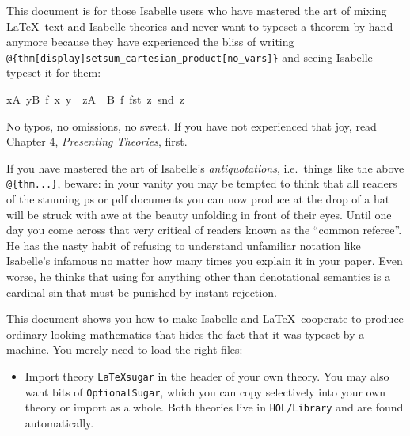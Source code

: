 %
\begin{isabellebody}%
\def\isabellecontext{Sugar}%
\isamarkupfalse%
%
\isamarkuptrue%
%
\begin{isamarkuptext}%
This document is for those Isabelle users who have mastered
the art of mixing \LaTeX\ text and Isabelle theories and never want to
typeset a theorem by hand anymore because they have experienced the
bliss of writing \verb!@!\verb!{thm[display]setsum_cartesian_product[no_vars]}!
and seeing Isabelle typeset it for them:
\begin{isabelle}%
{\isacharparenleft}{\isasymSum}x{\isasymin}A{\isachardot}\ {\isasymSum}y{\isasymin}B{\isachardot}\ f\ x\ y{\isacharparenright}\ {\isacharequal}\ {\isacharparenleft}{\isasymSum}z{\isasymin}A\ {\isasymtimes}\ B{\isachardot}\ f\ {\isacharparenleft}fst\ z{\isacharparenright}\ {\isacharparenleft}snd\ z{\isacharparenright}{\isacharparenright}%
\end{isabelle}
No typos, no omissions, no sweat.
If you have not experienced that joy, read Chapter 4, \emph{Presenting
Theories}, \cite{LNCS2283} first.

If you have mastered the art of Isabelle's \emph{antiquotations},
i.e.\ things like the above \verb!@!\verb!{thm...}!, beware: in your vanity
you may be tempted to think that all readers of the stunning ps or pdf
documents you can now produce at the drop of a hat will be struck with
awe at the beauty unfolding in front of their eyes. Until one day you
come across that very critical of readers known as the ``common referee''.
He has the nasty habit of refusing to understand unfamiliar notation
like Isabelle's infamous \isa{{\isasymlbrakk}\ {\isasymrbrakk}\ {\isasymLongrightarrow}} no matter how many times you
explain it in your paper. Even worse, he thinks that using \isa{{\isasymlbrakk}\ {\isasymrbrakk}} for anything other than denotational semantics is a cardinal sin
that must be punished by instant rejection.


This document shows you how to make Isabelle and \LaTeX\ cooperate to
produce ordinary looking mathematics that hides the fact that it was
typeset by a machine. You merely need to load the right files:
\begin{itemize}
\item Import theory \texttt{LaTeXsugar} in the header of your own
theory.  You may also want bits of \texttt{OptionalSugar}, which you can
copy selectively into your own theory or import as a whole.  Both
theories live in \texttt{HOL/Library} and are found automatically.


\end{itemize}
\end{isamarkuptext}
\end{isabellebody}
